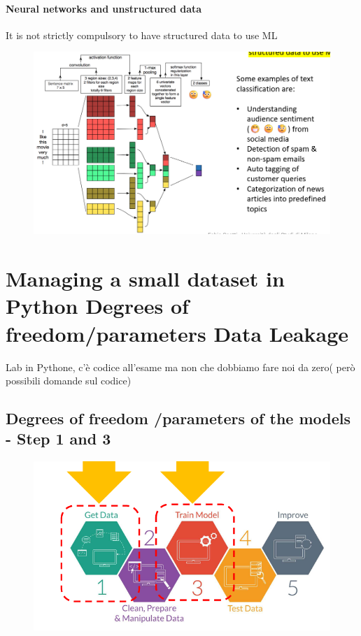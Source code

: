 \documentclass{report}
\begin{document}
\subsubsection{Neural networks and unstructured data}
\noindent It is not strictly compulsory to have structured data to use ML 

\begin{figure}[H]
    \centering
    \includegraphics[width=0.8\linewidth]{images/unstructured data.png}
\end{figure}



\chapter{Managing a small dataset in Python Degrees of freedom/parameters Data Leakage}
Lab in Pythone, c'è codice all'esame ma non che dobbiamo fare noi da zero( però possibili domande sul codice)


\section{Degrees of freedom /parameters of the models - Step 1 and 3}


\begin{figure}[H]
    \centering
    \includegraphics[width=0.8\linewidth]{images/step 1 and 3.png}
\end{figure}
\end{document}
